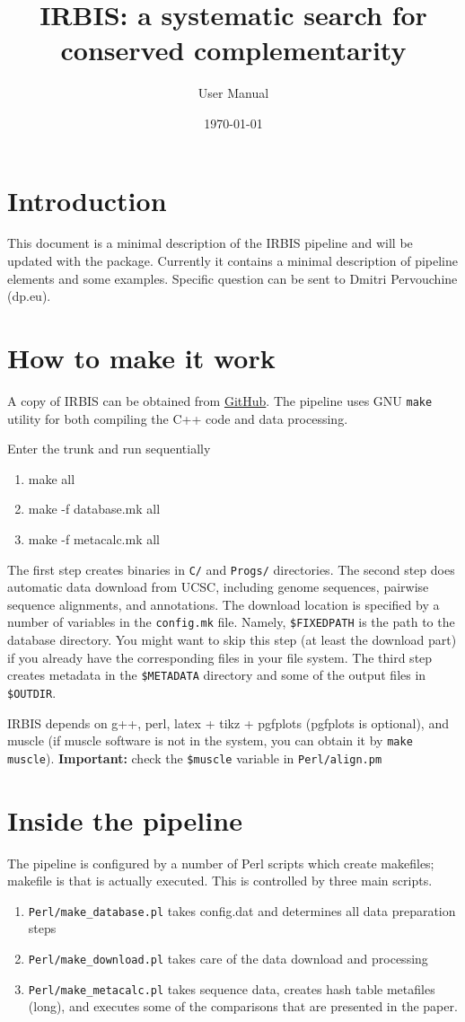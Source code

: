 \documentclass{article}
\title{IRBIS: a systematic search for conserved complementarity}
\author{\sc User Manual}
\date{\today}
\begin{document}
\maketitle
\tableofcontents
\section{Introduction}
This document is  a minimal description of the IRBIS pipeline and will be updated with the package. Currently it 
contains a minimal description of pipeline elements and some examples. Specific question can be sent to Dmitri 
Pervouchine (dp\@crg.eu).

\section{How to make it work}
A copy of IRBIS can be obtained from \href{https://github.com/pervouchine/irbis}{GitHub}. 
The pipeline uses GNU {\tt make} utility for both compiling the C++ code and data processing. 

Enter the trunk and run sequentially
\begin{enumerate} 
\tt
\item make all
\item make -f database.mk all
\item make -f metacalc.mk all
\end{enumerate}

The first step creates binaries in {\tt C/} and {\tt Progs/} directories. The second step does automatic data download 
from UCSC, including genome sequences, pairwise sequence alignments, and annotations. The download location is specified 
by a number of variables in the {\tt config.mk} file. Namely, {\tt \$FIXEDPATH} is the path to the database directory. 
You might want to skip this step (at least the download part) if you already have the corresponding files in your file 
system. The third step creates metadata in the {\tt \$METADATA} directory and some of the output files in {\tt \$OUTDIR}.

IRBIS depends on g++, perl, latex + tikz + pgfplots (pgfplots is optional), and muscle (if muscle software is 
not in the system, you can obtain it by {\tt make muscle}). {\bf Important:} check the {\tt \$muscle} variable in {\tt Perl/align.pm}

\section{Inside the pipeline}
The pipeline is configured by a number of Perl scripts which create makefiles; makefile is that is actually executed. This is 
controlled by three main scripts.
\begin{enumerate}
\item {\tt Perl/make\_database.pl} takes config.dat and determines all data preparation steps
\item {\tt Perl/make\_download.pl} takes care of the data download and processing
\item {\tt Perl/make\_metacalc.pl} takes sequence data, creates hash table metafiles (long), and executes some of the comparisons 
that are presented in the paper.
\end{enumerate}
\end{document}
